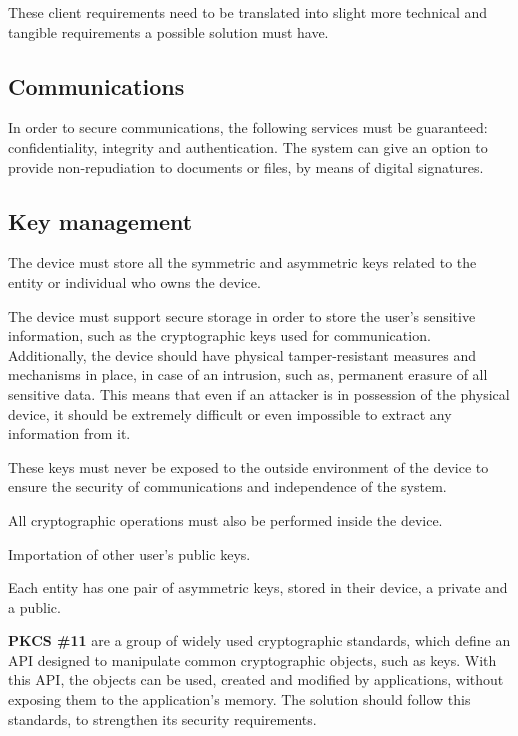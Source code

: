 These client requirements need to be translated into slight more technical and tangible requirements a possible solution must have.

\subsection{Communications}\label{chap:problem:services:comms}
In order to secure communications, the following services must be guaranteed: confidentiality, integrity and authentication.
The system can give an option to provide non-repudiation to documents or files, by means of digital signatures.

\subsection{Key management}\label{chap:problem:services:key}
The device must store all the symmetric and asymmetric keys related to the entity or individual who owns the device.

The device must support secure storage in order to store the user's sensitive information, such as the cryptographic keys used for communication.
Additionally, the device should have physical tamper-resistant measures and mechanisms in place, in case of an intrusion, such as, permanent erasure of all sensitive data. 
This means that even if an attacker is in possession of the physical device, it should be extremely difficult or even impossible to extract any information from it.

These keys must never be exposed to the outside environment of the device to ensure the security of communications and independence of the system.

All cryptographic operations must also be performed inside the device.

Importation of other user's public keys.

Each entity has one pair of asymmetric keys, stored in their device, a private and a public.

\textbf{\ac{PKCS} \#11} are a group of widely used cryptographic standards, which define an \ac{API} designed to manipulate common cryptographic objects, such as keys.
With this \ac{API}, the objects can be used, created and modified by applications, without exposing them to the application's memory.
The solution should follow this standards, to strengthen its security requirements.

